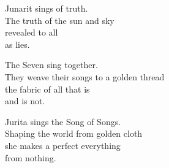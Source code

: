 \begin{singlespace}
\noindent Junarit sings of truth. \\
The truth of the sun and sky \\
revealed to all \\
as lies.
\end{singlespace}
\vspace{1.0em}

\begin{singlespace}
\noindent The Seven sing together. \\
They weave their songs to a golden thread \\
the fabric of all that is \\
and is not.
\end{singlespace}
\vspace{1.0em}

\begin{singlespace}
\noindent Jurita sings the Song of Songs. \\
Shaping the world from golden cloth \\
she makes a perfect everything \\
from nothing.
\end{singlespace}
